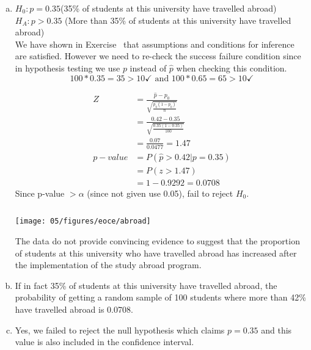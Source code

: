 {
\begin{enumerate}[(a)]
\item $H_0: p = 0.35$(35\% of students at this university have travelled abroad) \\
$H_A: p > 0.35$ (More than 35\% of students at this university have travelled abroad) \\

We have shown in Exercise~ that assumptions and conditions for inference are satisfied. However we need to re-check the success failure condition since in hypothesis testing we use $p$ instead of $\hat{p}$ when checking this condition.
\[ 100 * 0.35 = 35 > 10 \checkmark \text{ and } 100 * 0.65 = 65 > 10 \checkmark \]

\begin{minipage}[c]{0.45\textwidth}
\begin{align*}
Z &= \frac{\hat{p} - p_0}{\sqrt{\frac{p_0 (1 - p_0)}{n}}} \\
&= \frac{ 0.42 - 0.35}{\sqrt{ \frac{0.35 (1 - 0.35)} {100} }} \\
&= \frac{0.07}{0.0477} = 1.47 \\
p-value &= P(\hat{p} > 0.42 | p = 0.35) \\
&= P(z > 1.47) \\
&= 1 - 0.9292 = 0.0708
\end{align*}
Since p-value $> \alpha$ (since not given use 0.05), fail to reject $H_0$. \\
\end{minipage}
\begin{minipage}[c]{0.05\textwidth}
$\:$
\end{minipage}
\begin{minipage}[c]{0.5\textwidth}
\begin{center}
\texttt{[image: 05/figures/eoce/abroad]}
\end{center}
The data do not provide convincing evidence to suggest that the proportion of students at this university who have travelled abroad has increased after the implementation of the study abroad program.
\end{minipage}

\item If in fact 35\% of students at this university have travelled abroad, the probability of getting a random sample of 100 students where more than 42\% have travelled abroad is 0.0708.

\item Yes, we failed to reject the null hypothesis which claims $p = 0.35$ and this value is also included in the confidence interval.

\end{enumerate}

}


